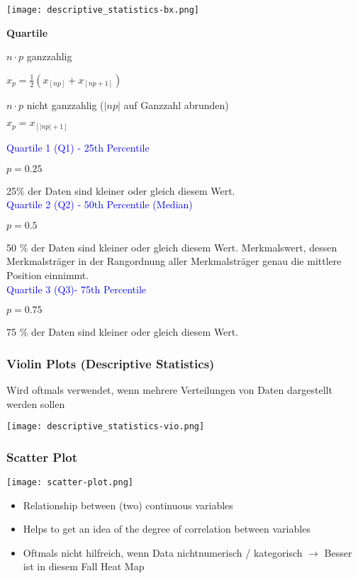 \texttt{[image: descriptive\_statistics-bx.png]}

\textbf{Quartile}

\begin{center}
    $n \cdot p$ ganzzahlig

    $x_p = \frac{1}{2} ( x_{[np]} + x_{[np + 1]})$

    $n \cdot p$ nicht ganzzahlig ($|np|$ auf Ganzzahl abrunden)

    $x_p = x_{[|np|+1]}$ \\
\end{center}

\textcolor{blue}{Quartile 1 (Q1) - 25th Percentile}

$p = 0.25$

25\% der Daten sind kleiner oder gleich diesem Wert. \\

\textcolor{blue}{Quartile 2 (Q2) - 50th Percentile (Median)}

$p = 0.5$

50 \% der Daten sind kleiner oder gleich diesem Wert. Merkmalswert, dessen Merkmalsträger in der Rangordnung aller Merkmalsträger genau die mittlere Position einnimmt. \\

\textcolor{blue}{Quartile 3 (Q3)- 75th Percentile}

$p = 0.75$

75 \% der Daten sind kleiner oder gleich diesem Wert.


\subsubsection{Violin Plots (Descriptive Statistics)}

Wird oftmals verwendet, wenn mehrere Verteilungen von Daten dargestellt werden sollen

\texttt{[image: descriptive\_statistics-vio.png]}


\subsubsection{Scatter Plot}

\texttt{[image: scatter-plot.png]}

\begin{itemize}
    \item Relationship between (two) continuous variables
    \item Helps to get an idea of the degree of correlation between variables
    \item Oftmals nicht hilfreich, wenn Data nichtnumerisch / kategorisch $\rightarrow$ Besser ist in diesem Fall Heat Map
\end{itemize}

